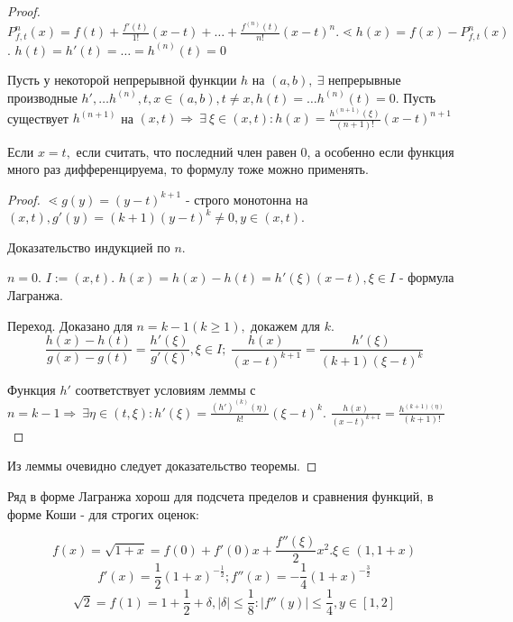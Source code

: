 \documentclass[12pt]{report}
\begin{document}
\begin{proof}
$P^n_{f, t}(x) = f(t) + \frac{f'(t)}{1!}(x - t) + \dots + \frac{f^{(n)}(t)}{n!}(x - t)^n. \lessdot h(x) = f(x) - P^n_{f, t}(x)$. $h(t) = h'(t) = \dots = h^{(n)}(t) = 0$

\begin{lm}
Пусть у некоторой непрерывной функции $h$ на $(a, b), ~\exists $ непрерывные производные $h', \dots h^{(n)}, t, x \in (a, b), t \neq x, h(t) = \dots h^{(n)}(t) = 0$. Пусть существует $h^{(n + 1)}$ на $(x, t) \Rightarrow ~\exists ~\xi \in (x, t): h(x) = \frac{h^{(n + 1)}(\xi)}{(n + 1)!}(x - t)^{n + 1}$
\end{lm}

\begin{note}
Если $x = t, $ если считать, что последний член равен $0$, а особенно если функция много раз дифференцируема, то формулу тоже можно применять.
\end{note}

\begin{proof}
$\lessdot g(y) = (y - t)^{k + 1}$ - строго монотонна на $(x, t), g'(y) = (k + 1)(y - t)^k \neq 0, y \in (x, t)$.

Доказательство индукцией по $n$. 

$n = 0$. $I := (x, t)$. $h(x) = h(x) - h(t) = h'(\xi)(x - t), \xi \in I$ - формула Лагранжа.

Переход. Доказано для $n = k - 1 (k \ge 1),$ докажем для $k$. 
$$\frac{h(x) - h(t)}{g(x) - g(t)} = \frac{h'(\xi)}{g'(\xi)}, \xi \in I; ~\frac{h(x)}{(x - t)^{k + 1}} = \frac{h'(\xi)}{(k + 1)(\xi - t)^k}$$

Функция $h'$ соответствует условиям леммы с $n = k - 1 \Rightarrow ~\exists \eta \in (t, \xi): h'(\xi) = \frac{(h')^{(k)}(\eta)}{k!}(\xi - t)^k$. $\frac{h(x)}{(x - t)^{k + 1}} = \frac{h^{(k + 1)(\eta)}}{(k + 1)!}$
\end{proof}

Из леммы очевидно следует доказательство теоремы.
\end{proof}

\begin{ex}
Ряд в форме Лагранжа хорош для подсчета пределов и сравнения функций, в форме Коши - для строгих оценок:

$$f(x)= \sqrt{1 + x} = f(0) + f'(0)x + \frac{f''(\xi)}{2}x^2. \xi \in (1, 1 + x)$$
$$f'(x) = \frac{1}{2}(1 + x)^{-\frac{1}{2}}; f''(x) = -\frac{1}{4}(1 + x)^{-\frac{3}{2}}$$
$$\sqrt{2} = f(1) = 1 + \frac{1}{2} + \delta, |\delta| \le \frac{1}{8}: |f''(y)| \le \frac{1}{4}, y \in [1, 2]$$
\end{ex}
\end{document}
